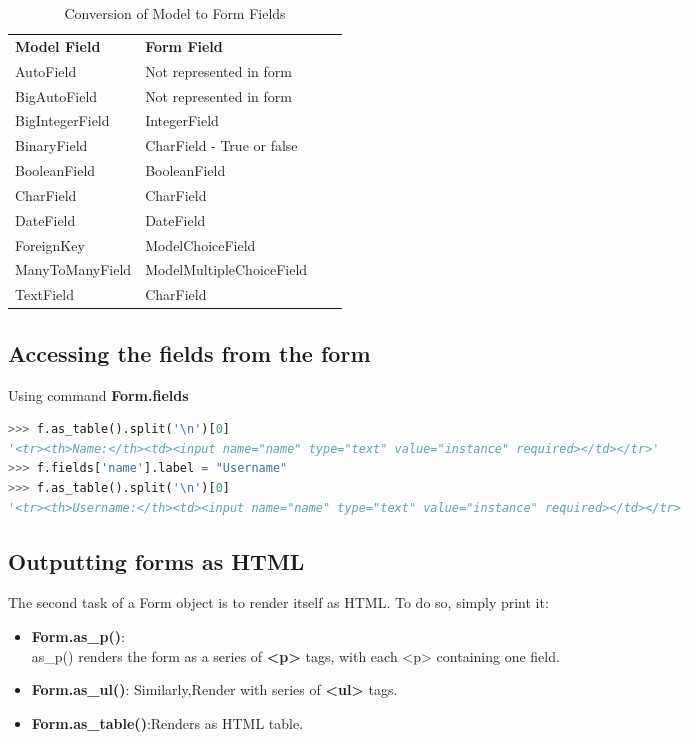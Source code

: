 \begin{table}[]
	\begin{tabular}{|l|l|ll}
		\cline{1-2}
		\textbf{Model Field} & \textbf{Form Field}       &  &  \\ \cline{1-2}
		AutoField            & Not represented in form   &  &  \\ \cline{1-2}
		BigAutoField         & Not represented in form   &  &  \\ \cline{1-2}
		BigIntegerField      & IntegerField              &  &  \\ \cline{1-2}
		BinaryField          & CharField - True or false &  &  \\ \cline{1-2}
		BooleanField         & BooleanField              &  &  \\ \cline{1-2}
		CharField            & CharField                 &  &  \\ \cline{1-2}
		DateField            & DateField                 &  &  \\ \cline{1-2}
		ForeignKey           & ModelChoiceField          &  &  \\ \cline{1-2}
		ManyToManyField      & ModelMultipleChoiceField  &  &  \\ \cline{1-2}
		TextField            & CharField                 &  &  \\ \cline{1-2}
	\end{tabular}
\caption{Conversion of Model to Form Fields }
\label{tab:my-table}
\end{table}
\subsection{Accessing the fields from the form}
Using command \textbf{Form.fields}
\begin{lstlisting}[language=python,numbers=none]
>>> f.as_table().split('\n')[0]
'<tr><th>Name:</th><td><input name="name" type="text" value="instance" required></td></tr>'
>>> f.fields['name'].label = "Username"
>>> f.as_table().split('\n')[0]
'<tr><th>Username:</th><td><input name="name" type="text" value="instance" required></td></tr>
\end{lstlisting}

\subsection{Outputting forms as HTML}
The second task of a Form object is to render itself as HTML. To do so, simply print it:
\begin{itemize}
	\item \textbf{Form.as\_p()}:\\
	as\_p() renders the form as a series of \textbf{<p>} tags, with each <p> containing one field.
	\item \textbf{Form.as\_ul()}: Similarly,Render with series of \textbf{<ul>} tags.
	\item \textbf{Form.as\_table()}:Renders as HTML table.
\end{itemize}
\newpage
